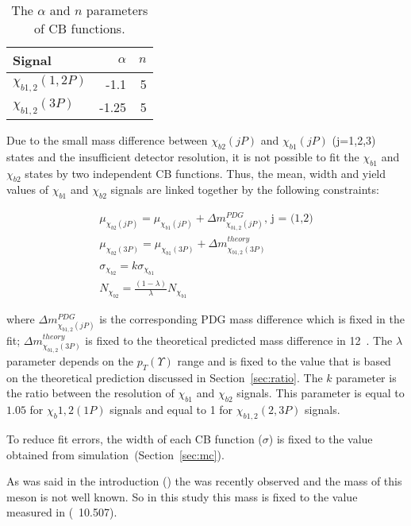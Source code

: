 \begin{table}[H]
\caption{\small   The $\alpha$ and $n$ parameters of CB functions.}
\centering
\begin{tabular}{lrr}
\toprule
Signal & $\alpha$ & $n$ \\
\midrule
$\chi_{b1,2}(1,2P)$ & -1.1 & 5 \\
$\chi_{b1,2}(3P)$ & -1.25 & 5 \\
\bottomrule
\end{tabular}
\label{tab:chib:fit:tail}
\end{table}

Due to the small mass difference between $\chi_{b2}(jP)$ and $\chi_{b1}(jP)$
(j=1,2,3) states and the insufficient detector resolution, it is not possible
to fit the $\chi_{b1}$ and $\chi_{b2}$ states by two independent CB functions.
Thus, the mean, width and yield values of  $\chi_{b1}$ and $\chi_{b2}$ signals
are linked together by the following constraints:

\begin{equation}
  \begin{aligned}
\mu_{\chi_{b2}(jP)} = \mu_{\chi_{b1}(jP)} + \Delta m_{\chi_{b1,2}(jP)}^{PDG} \text{, j = (1,2)}\\
\mu_{\chi_{b2}(3P)} = \mu_{\chi_{b1}(3P)} + \Delta m_{\chi_{b1,2}(3P)}^{theory} \\
\sigma_{\chi_{b2}} = k \sigma_{\chi_{b1}}\\
N_{\chi_{b2}} = \frac{(1-\lambda)}{\lambda} N_{\chi_{b1}}
  \end{aligned}
\end{equation}

\noindent where $\Delta m_{\chi_{b1,2}(jP)}^{PDG}$ is the corresponding PDG
mass difference which is fixed in the fit; $\Delta
m_{\chi_{b1,2}(3P)}^{theory}$ is fixed to the theoretical predicted mass
difference in 12\mevcc~\cite{Motyka:1997di}. The $\lambda$ parameter depends on
the $p_T(\Upsilon)$ range and is fixed to the value that is based on the
theoretical prediction discussed in Section~\ref{sec:ratio}. The $k$ parameter
is the ratio between the resolution of $\chi_{b1}$ and $\chi_{b2}$ signals.
This parameter is equal to $1.05$ for $\chi_b{1,2}(1P)$ signals and equal to 1
for $\chi_{b1,2}(2,3P)$ signals.

To reduce fit
errors, the width of each CB function ($\sigma$) is fixed to the value obtained
from simulation~(Section~\ref{sec:mc}).

As was said in the introduction () the \chibThreeP  was
recently observed and the mass of this meson is not well known.
So in this study this mass is fixed to the value measured in
 (~10.507\gevcc).

